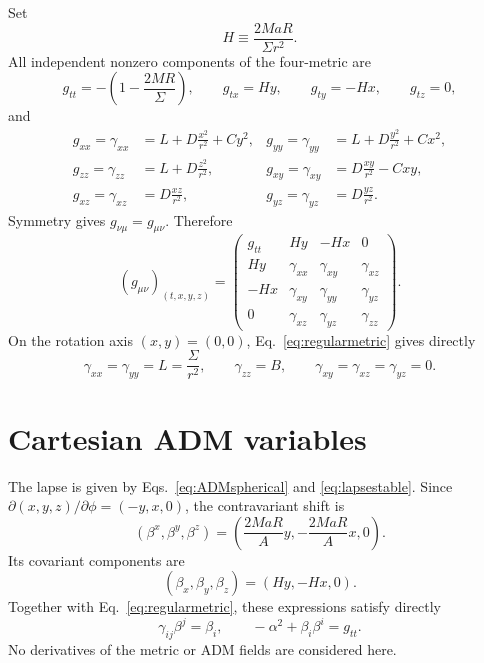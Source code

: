 \documentclass[11pt]{article}
\newcommand{\RBL}{R}
\begin{document}
Set
\begin{equation}
 H\equiv\frac{2Ma\RBL}{\Sigma r^2}. \label{eq:Hdef}
\end{equation}
All independent nonzero components of the four-metric are
\begin{equation}
 g_{tt}=-\left(1-\frac{2M\RBL}{\Sigma}\right),\qquad
 g_{tx}=Hy,\qquad g_{ty}=-Hx,\qquad g_{tz}=0, \label{eq:gtime}
\end{equation}
and
\begin{align}
 g_{xx}=\gamma_{xx}&=L+D\frac{x^2}{r^2}+Cy^2, &
 g_{yy}=\gamma_{yy}&=L+D\frac{y^2}{r^2}+Cx^2, \label{eq:gdiagxy}\\
 g_{zz}=\gamma_{zz}&=L+D\frac{z^2}{r^2}, &
 g_{xy}=\gamma_{xy}&=D\frac{xy}{r^2}-Cxy, \label{eq:gzzxy}\\
 g_{xz}=\gamma_{xz}&=D\frac{xz}{r^2}, &
 g_{yz}=\gamma_{yz}&=D\frac{yz}{r^2}. \label{eq:gxzyz}
\end{align}
Symmetry gives $g_{\nu\mu}=g_{\mu\nu}$. Therefore
\begin{equation}
 (g_{\mu\nu})_{(t,x,y,z)}=
 \begin{pmatrix}
 g_{tt}&Hy&-Hx&0\\
 Hy&\gamma_{xx}&\gamma_{xy}&\gamma_{xz}\\
 -Hx&\gamma_{xy}&\gamma_{yy}&\gamma_{yz}\\
 0&\gamma_{xz}&\gamma_{yz}&\gamma_{zz}
 \end{pmatrix}. \label{eq:gmatrix}
\end{equation}
On the rotation axis $(x,y)=(0,0)$, Eq.~\eqref{eq:regularmetric} gives directly
\begin{equation}
 \gamma_{xx}=\gamma_{yy}=L=\frac{\Sigma}{r^2},\qquad
 \gamma_{zz}=B,\qquad
 \gamma_{xy}=\gamma_{xz}=\gamma_{yz}=0. \label{eq:axisvalues}
\end{equation}

\section{Cartesian ADM variables}

The lapse is given by Eqs.~\eqref{eq:ADMspherical} and \eqref{eq:lapsestable}. Since $\partial(x,y,z)/\partial\phi=(-y,x,0)$, the contravariant shift is
\begin{equation}
 \boxed{
 (\beta^x,\beta^y,\beta^z)
 =\left(\frac{2Ma\RBL}{A}y,-\frac{2Ma\RBL}{A}x,0\right).} \label{eq:betaup}
\end{equation}
Its covariant components are
\begin{equation}
 \boxed{(\beta_x,\beta_y,\beta_z)=(Hy,-Hx,0).} \label{eq:betadown}
\end{equation}
Together with Eq.~\eqref{eq:regularmetric}, these expressions satisfy directly
\begin{equation}
 \gamma_{ij}\beta^j=\beta_i,
 \qquad
 -\alpha^2+\beta_i\beta^i=g_{tt}. \label{eq:ADMchecks}
\end{equation}
No derivatives of the metric or ADM fields are considered here.
\end{document}
